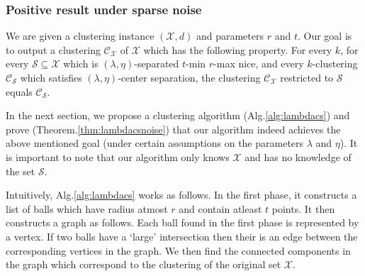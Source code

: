 \documentclass[anon,12pt]{colt2016} %
\newcommand{\mc}{\mathcal}
\begin{document}
\subsubsection{Positive result under sparse noise}
\label{section:lambdaPositiveResultSparseNoise}
We are given a clustering instance $(\mc X, d)$ and parameters $r$ and $t$. Our goal is to output a clustering $\mc C_{\mc X}$ of $\mc X$ which has the following property. For every $k$, for every $\mc S \subseteq \mc X$ which is $(\lambda, \eta)$-separated $t$-min $r$-max nice, and every $k$-clustering $\mc C_{\mc S}$ which satisfies $(\lambda, \eta)$-center separation, the clustering $\mc C_{\mc X}$ restricted to $\mc S$ equals $\mc C_{\mc S}$. 

In the next section, we propose a clustering algorithm (Alg.\ref{alg:lambdacs}) and prove (Theorem.\ref{thm:lambdacsnoise}) that our algorithm indeed achieves the above mentioned goal (under certain assumptions on the parameters $\lambda$ and $\eta$). It is important to note that our algorithm only knows $\mc X$ and has no knowledge of the set $\mc S$. 

Intuitively, Alg.\ref{alg:lambdacs} works as follows. In the first phase, it constructs a list of balls which have radius atmost $r$ and contain atleast $t$ points. It then constructs a graph as follows. Each ball found in the first phase is represented by a vertex. If two balls have a `large' intersection then their is an edge between the corresponding vertices in the graph. We then find the connected components in the graph which correspond to the clustering of the original set $\mc X$. 
\end{document}
